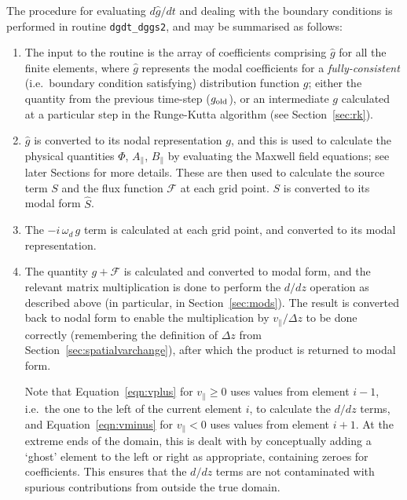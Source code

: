 \documentclass[10pt,a4paper]{article}
\begin{document}
The procedure for evaluating $d\hat{g}/dt$ and dealing with the boundary
conditions is performed in routine \texttt{dgdt\_dggs2}, and may be summarised
as follows:
\begin{enumerate}

\item The input to the routine is the array of coefficients comprising
  $\hat{g}$ for all the finite elements, where $\hat{g}$ represents the modal
  coefficients for a \textit{fully-consistent}\/ (i.e.\ boundary condition
  satisfying) distribution function $g$; either the quantity from the previous
  time-step ($g_{\mbox{\scriptsize old}}$), or an intermediate $g$ calculated
  at a particular step in the Runge-Kutta algorithm (see
  Section~\ref{sec:rk}).

\item $\hat{g}$ is converted to its nodal representation $g$, and this is used
  to calculate the physical quantities $\Phi$, $A_\parallel$, $B_\parallel$ by
  evaluating the Maxwell field equations; see later Sections for more
  details. These are then used to calculate the source term $S$ and the flux
  function $\mathcal{F}$ at each grid point. $S$ is converted to its modal
  form $\hat{S}$.

\item The $-i\, \omega_d \,g$ term is calculated at each grid point, and
  converted to its modal representation.

\item The quantity $g+\mathcal{F}$ is calculated and converted to modal form,
  and the relevant matrix multiplication is done to perform the $d/dz$
  operation as described above (in particular, in Section~\ref{sec:mods}). The
  result is converted back to nodal form to enable the multiplication by
  $v_\parallel/\Delta z$ to be done correctly (remembering the definition of
  $\Delta z$ from Section~\ref{sec:spatialvarchange}), after which the product
  is returned to modal form.

  Note that Equation~\ref{eqn:vplus} for $v_\parallel \geq 0$ uses values from
  element $i-1$, i.e.\ the one to the left of the current element $i$, to
  calculate the $d/dz$ terms, and Equation~\ref{eqn:vminus} for $v_\parallel <
  0$ uses values from element $i+1$. At the extreme ends of the domain, this
  is dealt with by conceptually adding a `ghost' element to the left or right
  as appropriate, containing zeroes for coefficients. This ensures that the
  $d/dz$ terms are not contaminated with spurious contributions from outside
  the true domain.


\end{enumerate}
\end{document}
